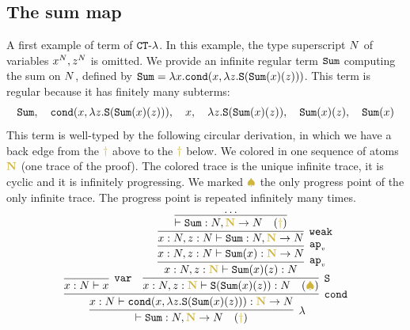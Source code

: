 \documentclass{article}
\begin{document}
\subsection{The sum map}
A first example of term of  ${ {\tt CT} \mbox{-} \lambda}$. 
In this example, the type superscript ${N}$ of variables $x^{N}, z^{N}$ is omitted.
We provide an infinite regular term ${\tt Sum}$ computing the sum on ${N}$,
defined by ${\tt Sum} = \lambda x.{\tt cond}(x,\lambda z.{\tt S}({\tt Sum}(x)(z)))$.
This term is regular because it has finitely many subterms: 
$$
\Sum, \  \  \ \cond(x,\lambda z.\Succ(\Sum(x)(z))), 
\  \  \ x, \  \  \ \lambda z.\Succ(\Sum(x)(z)),  \  \  \ \Sum(x)(z), \  \  \ \Sum(x)
$$
This term is well-typed by the following circular derivation, in which we have a back edge from the 
$\bfColor{oldgold}{\dagger}$ above to the $\bfColor{oldgold}{\dagger}$ below.
We colored in  one sequence of atoms $\bfColor{oldgold}{\N}$ 
(one trace of the proof).
The colored trace is the unique infinite trace, it is cyclic and it is infinitely progressing.
We marked $\bfColor{oldgold}{ \spadesuit}$ the only progress point of the only infinite trace.
The progress point is repeated infinitely many times.
\[
\infer[\lambda]{
  \vdash \Sum:\N, \bfColor{oldgold}{\N} \rightarrow \N 
   \ \ \ (\bfColor{oldgold}{\dagger})
}{
  \infer[\cond]{
    x : \N \vdash 
    \cond(x,\lambda z.\Succ(\Sum(x)(z))): \bfColor{oldgold}{\N} \rightarrow \N
  }{
    \infer[\var]{
      x : \N \vdash x
    }{}
    &
    \infer[\Succ]{
      x:\N, z : \bfColor{oldgold}{\N} 
      \vdash \Succ(\Sum(x)(z)): \N  
        \ \ \ (\bfColor{oldgold}{ \spadesuit})
    }{
      \infer[\apvar]{
       x:\N, z : \bfColor{oldgold}{\N} 
       \vdash \Sum(x)(z): \N
      }{
         \infer[\apvar]{
       x:\N, z : \N
       \vdash \Sum(x): \bfColor{oldgold}{\N} \rightarrow \N
         }{
         \infer[\weak]{
         x:\N, z : \N
         \vdash \Sum: \N, \bfColor{oldgold}{\N} \rightarrow  \N
          }{
         \infer{\vdash \Sum: \N, \bfColor{oldgold}{\N} \rightarrow \N 
           \ \ \ (\bfColor{oldgold}{\dagger})}{\ldots}
          }
        }
      }
    }
  }
}
\]

%

\end{document}
